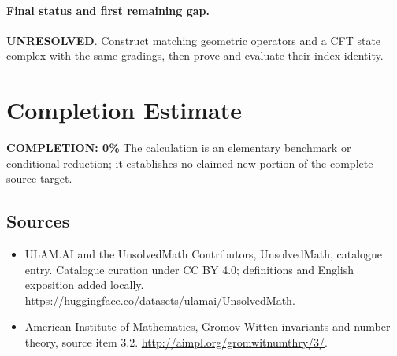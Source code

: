 \documentclass[11pt]{article}
\begin{document}
\paragraph{Final status and first remaining gap.}
\textbf{UNRESOLVED}. Construct matching geometric operators and a CFT state complex with the same gradings, then prove and evaluate their index identity.

\section{Completion Estimate}
\noindent\textbf{COMPLETION: 0\%}
The calculation is an elementary benchmark or conditional reduction; it establishes no claimed new portion of the complete source target.

\subsection{Sources}
\begin{itemize}
\item[\hypertarget{source:statement:1}{S1}] ULAM.AI and the UnsolvedMath Contributors, UnsolvedMath, catalogue entry. Catalogue curation under CC BY 4.0; definitions and English exposition added locally.
\url{https://huggingface.co/datasets/ulamai/UnsolvedMath}.
\item[\hypertarget{source:statement:2}{S2}] American Institute of Mathematics, Gromov-Witten invariants and number theory, source item 3.2.
\url{http://aimpl.org/gromwitnumthry/3/}.
\end{itemize}
\label{end:statement}
\end{document}
